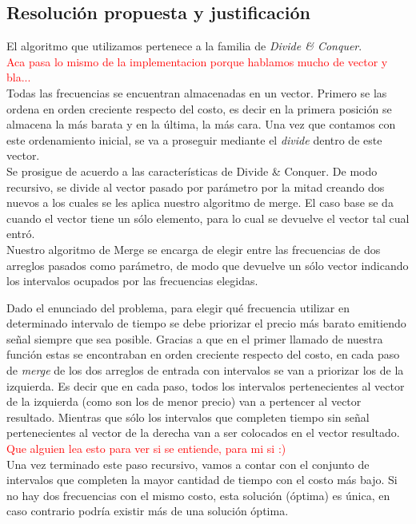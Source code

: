 \documentclass[a4paper]{article}
\begin{document}
\subsection{Resoluci\'on propuesta y justificaci\'on}

El algoritmo que utilizamos pertenece a la familia de \emph{Divide \& Conquer}.\\

\textcolor{red}{Aca pasa lo mismo de la implementacion porque hablamos mucho de vector y bla...}\\

Todas las frecuencias se encuentran almacenadas en un vector. Primero se las ordena en orden creciente respecto del costo, es decir en la primera posición se almacena la m\'as barata y en la última, la más cara. Una vez que contamos con este ordenamiento inicial, se va a proseguir mediante el \emph{divide} dentro de este vector.\\

Se prosigue de acuerdo a las características de Divide \& Conquer. De modo recursivo, se divide al vector pasado por parámetro por la mitad creando dos nuevos a los cuales se les aplica nuestro algoritmo de merge. El caso base se da cuando el vector tiene un sólo elemento, para lo cual se devuelve el vector tal cual entró.\\

Nuestro algoritmo de Merge se encarga de elegir entre las frecuencias de dos arreglos pasados como parámetro, de modo que devuelve un sólo vector indicando los intervalos ocupados por las frecuencias elegidas. 

Dado el enunciado del problema, para elegir qu\'e frecuencia utilizar en determinado intervalo de tiempo se debe priorizar el precio más barato emitiendo señal siempre que sea posible. Gracias a que en el primer llamado de nuestra funci\'on estas se encontraban en orden creciente respecto del costo, en cada paso de \emph{merge} de los dos arreglos de entrada con intervalos se van a priorizar los de la izquierda. Es decir que en cada paso, todos los intervalos pertenecientes al vector de la izquierda (como son los de menor precio) van a pertencer al vector resultado. Mientras que s\'olo los intervalos que completen tiempo sin se\~nal pertenecientes al vector de la derecha van a ser colocados en el vector resultado. \textcolor{red}{Que alguien lea esto para ver si se entiende, para mi si :)}\\

Una vez terminado este paso recursivo, vamos a contar con el conjunto de intervalos que completen la mayor cantidad de tiempo con el costo m\'as bajo. Si no hay dos frecuencias con el mismo costo, esta soluci\'on (\'optima) es \'unica, en caso contrario podr\'ia existir m\'as de una soluci\'on \'optima. \\
\end{document}
